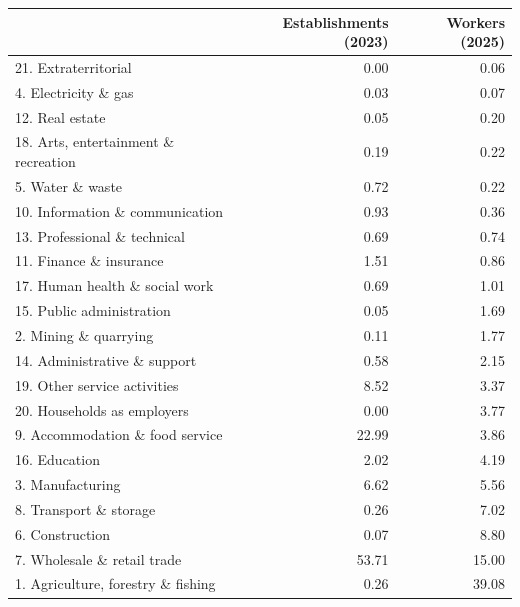 \begin{tabular}{lrr}
\toprule
 & Establishments (2023) & Workers (2025) \\
\midrule
21. Extraterritorial & 0.00 & 0.06 \\
4. Electricity \& gas & 0.03 & 0.07 \\
12. Real estate & 0.05 & 0.20 \\
18. Arts, entertainment \& recreation & 0.19 & 0.22 \\
5. Water \& waste & 0.72 & 0.22 \\
10. Information \& communication & 0.93 & 0.36 \\
13. Professional \& technical & 0.69 & 0.74 \\
11. Finance \& insurance & 1.51 & 0.86 \\
17. Human health \& social work & 0.69 & 1.01 \\
15. Public administration & 0.05 & 1.69 \\
2. Mining \& quarrying & 0.11 & 1.77 \\
14. Administrative \& support & 0.58 & 2.15 \\
19. Other service activities & 8.52 & 3.37 \\
20. Households as employers & 0.00 & 3.77 \\
9. Accommodation \& food service & 22.99 & 3.86 \\
16. Education & 2.02 & 4.19 \\
3. Manufacturing & 6.62 & 5.56 \\
8. Transport \& storage & 0.26 & 7.02 \\
6. Construction & 0.07 & 8.80 \\
7. Wholesale \& retail trade & 53.71 & 15.00 \\
1. Agriculture, forestry \& fishing & 0.26 & 39.08 \\
\bottomrule
\end{tabular}
